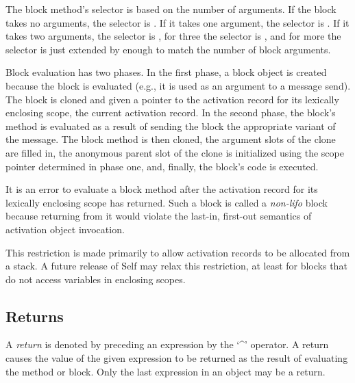 \documentclass[letterpaper,10pt,english]{sphinxmanual}
\begin{document}
The block method’s selector is based on the number of arguments. If the block takes no arguments,
the selector is . If it takes one argument, the selector is . If it takes two arguments,
the selector is , for three the selector is , and for more the selector
is just extended by enough  to match the number of block arguments.

Block evaluation has two phases. In the first phase, a block object is created because the block is
evaluated (e.g., it is used as an argument to a message send). The block is cloned and given a
pointer to the activation record for its lexically enclosing scope, the current activation record. In the
second phase, the block’s method is evaluated as a result of sending the block the appropriate variant
of the  message. The block method is then cloned, the argument slots of the clone are
filled in, the anonymous parent slot of the clone is initialized using the scope pointer determined in
phase one, and, finally, the block’s code is executed.

It is an error to evaluate a block method after the activation record for its lexically enclosing scope
has returned. Such a block is called a \emph{non-lifo} block because returning from it would violate the
last-in, first-out semantics of activation object invocation.

This restriction is made primarily to allow activation records to be allocated from a stack. A future
release of Self may relax this restriction, at least for blocks that do not access variables in
enclosing scopes.


\subsection{Returns}
\label{langref:returns}\label{langref:index-27}
A \emph{return} is denoted by preceding an expression by the ‘\textasciicircum{}’ operator. A return causes the value of the given expression to be returned as the result of evaluating the method or block. Only the last ex­pression in an object may be a return.
\end{document}
